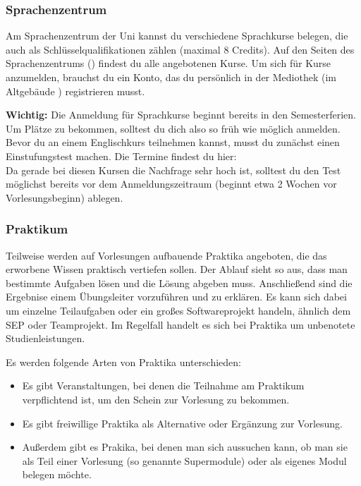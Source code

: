 	\subsubsection{Sprachenzentrum}
	Am Sprachenzentrum der Uni kannst du verschiedene Sprachkurse belegen, die auch als Schlüsselqualifikationen zählen (maximal 8 Credits). Auf den Seiten des Sprachenzentrums () findest du alle angebotenen Kurse. Um sich für Kurse anzumelden, brauchst du ein Konto, das du persönlich in der Mediothek (im Altgebäude ) registrieren musst.

	\textbf{Wichtig:} Die Anmeldung für Sprachkurse beginnt bereits in den Semesterferien. Um Plätze zu bekommen, solltest du dich also so früh wie möglich anmelden. Bevor du an einem Englischkurs teilnehmen kannst, musst du zunächst einen Einstufungstest machen. Die Termine findest du hier: \\ 
	Da gerade bei diesen Kursen die Nachfrage sehr hoch ist, solltest du den Test möglichst bereits vor dem Anmeldungszeitraum (beginnt etwa 2 Wochen vor Vorlesungsbeginn) ablegen.

	\subsubsection{Praktikum}
	Teilweise werden auf Vorlesungen aufbauende Praktika angeboten, die das erworbene Wissen praktisch vertiefen sollen. Der Ablauf sieht so aus, dass man bestimmte Aufgaben lösen und die Lösung abgeben muss. Anschließend sind die Ergebnise einem Übungsleiter vorzuführen und zu erklären. Es kann sich dabei um einzelne Teilaufgaben oder ein großes Softwareprojekt handeln, ähnlich dem SEP oder Teamprojekt. Im Regelfall handelt es sich bei Praktika um unbenotete Studienleistungen.

Es werden folgende	Arten von Praktika unterschieden:
	
	\begin{itemize}
		\item Es gibt Veranstaltungen, bei denen die Teilnahme am Praktikum verpflichtend ist, um den Schein zur Vorlesung zu bekommen. 
		\item Es gibt freiwillige Praktika als Alternative oder Ergänzung zur Vorlesung.
		\item Außerdem gibt es Prakika, bei denen man sich aussuchen kann, ob man sie als Teil einer Vorlesung (so genannte Supermodule) oder als eigenes Modul belegen möchte.
	\end{itemize}

